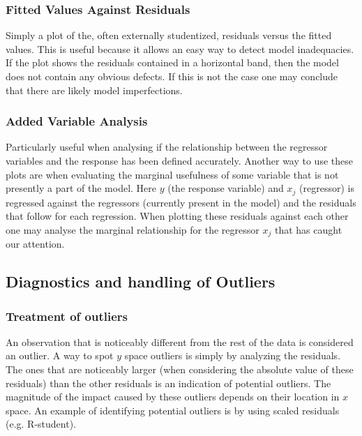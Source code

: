 \documentclass[11pt]{article}
\begin{document}
\subsubsection{Fitted Values Against Residuals}
\label{sec:orgad1de1a}

Simply a plot of the, often externally studentized, residuals versus the fitted values. This is useful
because it allows an easy way to detect model inadequacies. If the plot shows the residuals contained in
a horizontal band, then the model does not contain any obvious defects. If this is not the case one may
conclude that there are likely model imperfections.

\subsubsection{Added Variable Analysis}
\label{sec:org4c8dec6}

Particularly useful when analysing if the relationship between the regressor variables and the response
has been defined accurately. Another way to use these plots are when evaluating the marginal usefulness
of some variable that is not presently a part of the model. Here \(y\) (the response variable) and \(x_j\)
(regressor) is regressed against the regressors (currently present in the model) and the residuals that
follow for each regression. When plotting these residuals against each other one may analyse the marginal
relationship for the regressor \(x_j\) that has caught our attention.

\subsection{Diagnostics and handling of Outliers}
\label{sec:org8890723}
\subsubsection{Treatment of outliers}
\label{sec:org4a7543d}

An observation that is noticeably different from the rest of the data is considered an outlier. A way
to spot \(y\) space outliers is simply by analyzing the residuals. The ones that are noticeably larger 
(when considering the absolute value of these residuals) than the other residuals is an indication of
potential outliers. The magnitude of the impact caused by these outliers depends on their location
in \(x\) space. An example of identifying potential outliers is by using scaled residuals (e.g. R-student). 
\end{document}
